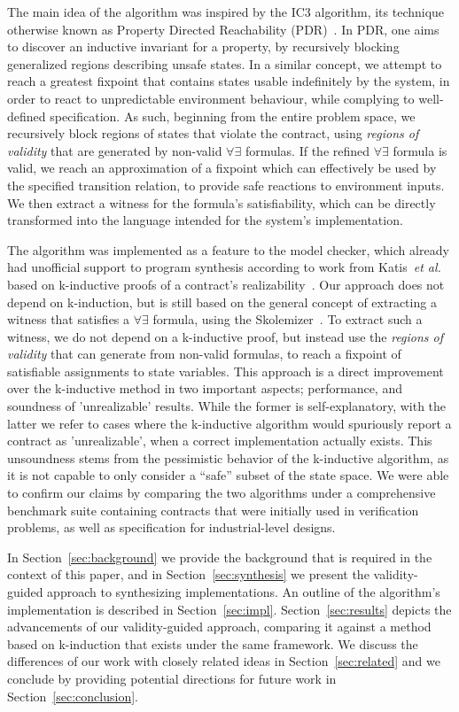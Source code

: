 The main idea of the algorithm was inspired by the IC3 algorithm, its
technique otherwise known as Property Directed Reachability
(PDR)~\cite{bradley2011sat,een2011efficient}. In PDR, one aims to discover an
inductive invariant for a property, by recursively blocking generalized regions describing unsafe states. In a similar concept, we attempt
to reach a greatest fixpoint that contains states usable indefinitely by the
system, in order to react to unpredictable environment behaviour, while
complying to well-defined specification. As such, beginning from the entire
problem space, we recursively block regions of states that violate the contract, using \textit{regions of validity} that are
generated by non-valid $\forall\exists$ formulas. If the refined
$\forall\exists$ formula is valid, we reach an approximation of a fixpoint which can effectively be used by the specified transition relation, to
provide safe reactions to environment inputs. We then extract a witness for the
formula's satisfiability, which can be directly transformed into the
language intended for the system's implementation.

The algorithm was implemented as a feature to the \jkind model checker, which
already had unofficial support to program synthesis according to work from
Katis~\textit{et al.} based on k-inductive proofs of a contract's
realizability~\cite{gacek2015towards,katis2016towards,katis2016synthesis}.
Our approach does not depend on k-induction, but is still based on the general
concept of extracting a witness that satisfies a $\forall\exists$ formula, using
the \aeval Skolemizer~\cite{fedyukovich2015automated}. To extract such a witness, we do not depend on a k-inductive proof, but instead use the \textit{regions of validity} that \aeval can generate from non-valid formulas,
to reach a fixpoint of satisfiable assignments to state variables.
This approach is a direct improvement over the k-inductive method in two
important aspects; performance, and soundness of 'unrealizable' results. While
the former is self-explanatory, with the latter we refer to cases where the
k-inductive algorithm would spuriously report a contract as 'unrealizable', when a correct
implementation actually exists. This unsoundness stems from the pessimistic
behavior of the k-inductive algorithm, as it is not capable to only consider a
``safe'' subset of the state space. We were able to confirm our claims
by comparing the two algorithms under a comprehensive benchmark suite containing
contracts that were initially used in verification problems, as well as
specification for industrial-level designs.

In Section~\ref{sec:background} we provide the background that is required in the
context of this paper, and in Section~\ref{sec:synthesis} we present the validity-guided approach to synthesizing
implementations. 
An outline of the algorithm's implementation is described
in Section~\ref{sec:impl}. Section~\ref{sec:results} depicts the advancements of our validity-guided
approach, comparing it against a method based on k-induction that exists under the same framework.
We discuss the differences of our work with closely related ideas in
Section~\ref{sec:related} and we conclude by providing potential directions for future work in Section~\ref{sec:conclusion}.

